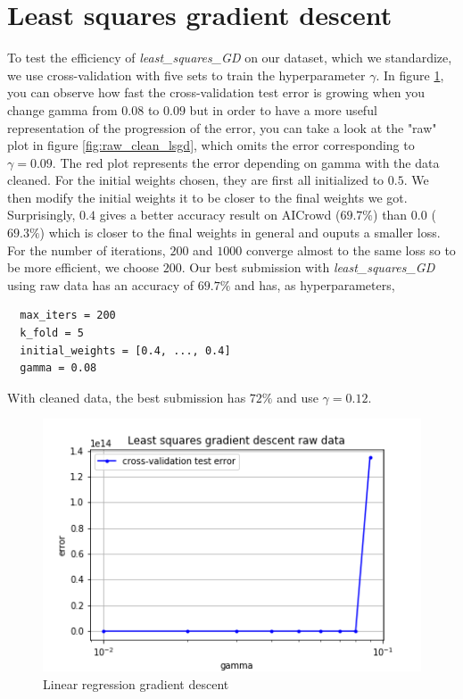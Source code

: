 \documentclass[11pt, a4paper, twocolumn]{article}
\begin{document}
\section{Least squares gradient descent}
To test the efficiency of \textit{least\_squares\_GD} on our dataset, 
which we standardize, we use cross-validation with five sets 
to train the hyperparameter $\gamma$.
In figure \ref{fig:lsgd}, 
you can observe how fast the cross-validation test error is growing 
when you change gamma from $0.08$ to $0.09$ 
but in order to have a more useful representation of the progression of the error, 
you can take a look at the "raw" plot in figure \ref{fig:raw_clean_lsgd}, 
which omits the error corresponding to $\gamma = 0.09$.
The red plot represents the error depending on gamma with the data cleaned.
For the initial weights chosen, they are first all initialized to $0.5$. 
We then modify the initial weights it to be closer to the final weights we got. 
Surprisingly, $0.4$ gives a better accuracy result on AICrowd ($69.7\%$) 
than $0.0$ ($69.3\%$) which is closer to the final weights 
in general and ouputs a smaller loss.
For the number of iterations, $200$ and $1000$ converge almost to the same loss 
so to be more efficient, we choose $200$.
Our best submission with \textit{least\_squares\_GD} using raw data 
has an accuracy of $69.7\%$ and has, as hyperparameters,
\begin{lstlisting}
  max_iters = 200
  k_fold = 5
  initial_weights = [0.4, ..., 0.4]
  gamma = 0.08
\end{lstlisting}
With cleaned data, the best submission has $72\%$ and use $\gamma = 0.12$.

\begin{figure}[h!]
  \includegraphics[width=\linewidth]{raw_data_least_squares_GD.png}
  \caption{Linear regression gradient descent}
  \label{fig:lsgd}
\end{figure}
\end{document}

